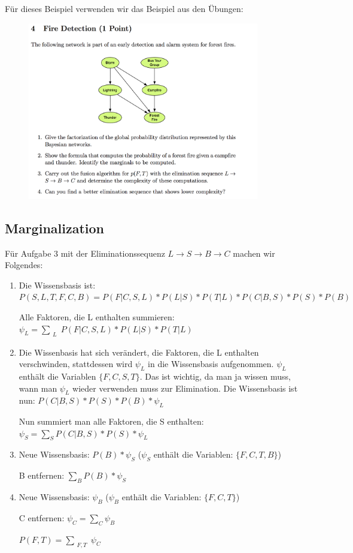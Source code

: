 Für dieses Beispiel verwenden wir das Beispiel aus den Übungen:
\begin{figure}[h!]
\center
\includegraphics[width=0.9\textwidth]{fig/exercise4bayes.png}
\end{figure}

\subsection{Marginalization}
Für Aufgabe 3 mit der Eliminationssequenz $L \rightarrow S \rightarrow B \rightarrow C$ machen wir Folgendes:

\begin{enumerate}
\item Die Wissensbasis ist: $P(S, L, T, F, C, B) = P(F | C, S, L) * P(L | S) * P(T | L) * P(C | B, S) * P(S) * P(B)$

Alle Faktoren, die L enthalten summieren: $\psi_L = \sum_{\substack{L}}P(F|C,S,L) * P(L|S)*P(T|L)$

\item Die Wissenbasis hat sich verändert, die Faktoren, die L enthalten verschwinden, stattdessen wird $\psi_L$ in die Wissensbasis aufgenommen. $\psi_L$ enthält die Variablen $\{F, C, S, T\}$. Das ist wichtig, da man ja wissen muss, wann man $\psi_L$ wieder verwenden muss zur Elimination. Die Wissensbasis ist nun: $P(C | B, S) * P(S) * P(B) * \psi_L$

Nun summiert man alle Faktoren, die S enthalten: $\psi_S = \sum_{S} P(C | B, S) * P(S) * \psi_L$

\item Neue Wissensbasis: $P(B)*\psi_S$ ($\psi_S$ enthält die Variablen: $\{F,C,T,B\}$)

B entfernen: $\sum_B P(B) * \psi_S$

\item Neue Wissensbasis: $\psi_B$ ($\psi_B$ enthält die Variablen: $\{F,C,T\}$)

C entfernen: $\psi_C = \sum_C \psi_B$

$P(F,T) = \sum_{\substack{F, T}} \psi_C$
\end{enumerate}
